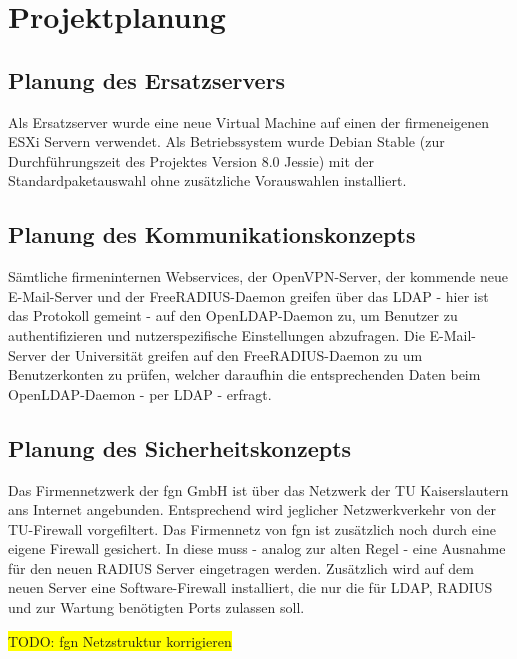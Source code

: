 \documentclass[11pt,a4paper,titlepage=firstiscover,headsepline,bibtotoc]{scrartcl} %
\newcommand{\hilight}[1]{\colorbox{yellow}{#1}} %
\begin{document}
\section{Projektplanung}
\subsection{Planung des Ersatzservers}
Als Ersatzserver wurde eine neue Virtual Machine auf einen der firmeneigenen ESXi Servern verwendet. Als Betriebssystem wurde Debian Stable (zur Durchführungszeit des Projektes Version 8.0 Jessie) mit der Standardpaketauswahl ohne zusätzliche Vorauswahlen installiert.

\subsection{Planung des Kommunikationskonzepts}
Sämtliche firmeninternen Webservices, der OpenVPN-Server, der kommende neue E-Mail-Server und der FreeRADIUS-Daemon greifen über das LDAP - hier ist das Protokoll gemeint - auf den OpenLDAP-Daemon zu, um Benutzer zu authentifizieren und nutzerspezifische Einstellungen abzufragen. Die E-Mail-Server der Universität greifen auf den FreeRADIUS-Daemon zu um Benutzerkonten zu prüfen, welcher daraufhin die entsprechenden Daten beim OpenLDAP-Daemon - per LDAP - erfragt.

\subsection{Planung des Sicherheitskonzepts}\label{sec:Sicherheitskonzept}
Das Firmennetzwerk der fgn GmbH ist über das Netzwerk der TU Kaiserslautern ans Internet angebunden. Entsprechend wird jeglicher Netzwerkverkehr von der TU-Firewall vorgefiltert. Das Firmennetz von fgn ist zusätzlich noch durch eine eigene Firewall gesichert. In diese muss - analog zur alten Regel - eine Ausnahme für den neuen RADIUS Server eingetragen werden. Zusätzlich wird auf dem neuen Server eine Software-Firewall installiert, die nur die für LDAP, RADIUS und zur Wartung benötigten Ports zulassen soll.

\hilight{TODO: fgn Netzstruktur korrigieren}
\end{document}
